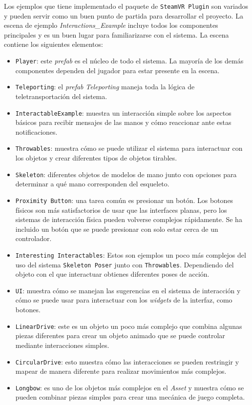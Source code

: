 Los ejemplos que tiene implementado el paquete de \texttt{SteamVR Plugin} son variados y pueden servir como un buen punto de partida para desarrollar el proyecto. La escena de ejemplo \textit{Interactions\_Example} incluye todos los componentes principales y es un buen lugar para familiarizarse con el sistema. La escena contiene los siguientes elementos:


\begin{itemize}
	\item \texttt{Player}: este \textit{prefab} es el núcleo de todo el sistema. La mayoría de los demás componentes dependen del jugador para estar presente en la escena.
\item \texttt{Teleporting}: el \textit{prefab} \textit{Teleporting} maneja toda la lógica de teletransportación del sistema.
\item \texttt{InteractableExample}: muestra un interacción simple sobre los aspectos básicos para recibir mensajes de las manos y cómo reaccionar ante estas notificaciones.
\item \texttt{Throwables}: muestra cómo se puede utilizar el sistema para interactuar con los objetos y crear diferentes tipos de objetos tirables.
\item \texttt{Skeleton}: diferentes objetos de modelos de mano junto con opciones para determinar a qué mano corresponden del esqueleto.
\item \texttt{Proximity Button}: una tarea común es presionar un botón. Los botones físicos son más satisfactorios de usar que las interfaces planas, pero los sistemas de interacción física pueden volverse complejos rápidamente. Se ha incluido un botón que se puede presionar con solo estar cerca de un controlador.
\item \texttt{Interesting Interactables}: Estos son ejemplos un poco más complejos del uso del sistema \texttt{Skeleton Poser} junto con \texttt{Throwables}. Dependiendo del objeto con el que interactuar obtienes diferentes poses de acción.
\item \texttt{UI}: muestra cómo se manejan las sugerencias en el sistema de interacción y cómo se puede usar para interactuar con los \textit{widgets} de la interfaz, como botones.
\item \texttt{LinearDrive}: este es un objeto un poco más complejo que combina algunas piezas diferentes para crear un objeto animado que se puede controlar mediante interacciones simples.
\item \texttt{CircularDrive}: esto muestra cómo las interacciones se pueden restringir y mapear de manera diferente para realizar movimientos más complejos.
\item \texttt{Longbow}: es uno de los objetos más complejos en el \textit{Asset} y muestra cómo se pueden combinar piezas simples para crear una mecánica de juego completa. 
\end{itemize}

